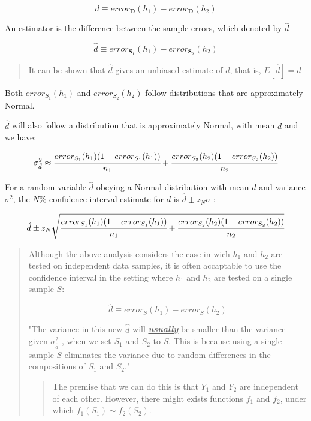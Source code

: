 \[d\equiv error_{\boldsymbol{D}}(h_1)-error_{\boldsymbol{D}}(h_2)\]

An estimator is the difference between the sample errors, which denoted
by \(\hat{d}\)

\[\hat{d}\equiv error_{\boldsymbol{S_1}}(h_1)-error_{\boldsymbol{S_2}}(h_2)\]

\begin{quote}
It can be shown that \(\hat{d}\) gives an unbiased estimate of \(d\),
that is, \(E[\hat{d}]=d\)
\end{quote}

Both \(error_{S_1}(h_1)\) and \(error_{S_2}(h_2)\) follow distributions
that are approximately Normal.

\(\hat{d}\) will also follow a distribution that is approximately
Normal, with mean \(d\) and we have:

\[\sigma^2_{\hat{d}}\approx\cfrac{error_{S_1}(h_1)(1-error_{S_1}(h_1))}{n_1}+\cfrac{error_{S_2}(h_2)(1-error_{S_2}(h_2))}{n_2}\]

For a random variable \(\hat{d}\) obeying a Normal distribution with
mean \(d\) and variance \(\sigma^2\), the \(N\%\) confidence interval
estimate for \(d\) is \(\hat{d}\pm z_N\sigma\) :

\[\hat{d}\pm z_N\sqrt{\cfrac{error_{S_1}(h_1)(1-error_{S_1}(h_1))}{n_1}+\cfrac{error_{S_2}(h_2)(1-error_{S_2}(h_2))}{n_2}}\]

\begin{quote}
Although the above analysis considers the case in wich \(h_1\) and
\(h_2\) are tested on independent data samples, it is often accaptable
to use the confidence interval in the setting where \(h_1\) and \(h_2\)
are tested on a single sample \(S\):

\[\hat{d}\equiv error_S(h_1)-error_S(h_2)\]

"The variance in this new \(\hat{d}\) will \emph{\textbf{\ul{usually}}}
be smaller than the variance given \(\sigma^2_{\hat{d}}\) , when we set
\(S_1\) and \(S_2\) to \(S\). This is because using a single sample
\(S\) eliminates the variance due to random differences in the
compositions of \(S_1\) and \(S_2\)."

\begin{quote}
The premise that we can do this is that \(Y_1\) and \(Y_2\) are
independent of each other. However, there might exists functions \(f_1\)
and \(f_2\), under which \(f_1(S_1)\sim f_2(S_2)\).
\end{quote}
\end{quote}

